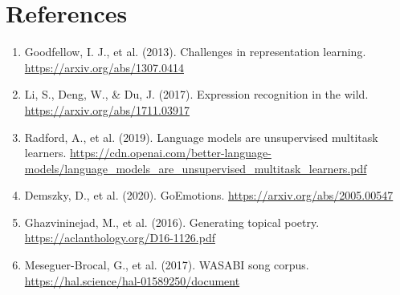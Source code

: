 \documentclass[11pt]{article}
\begin{document}
\section*{References}

\begin{enumerate}[leftmargin=*]
\item Goodfellow, I. J., et al. (2013). Challenges in representation learning. \url{https://arxiv.org/abs/1307.0414}
\item Li, S., Deng, W., \& Du, J. (2017). Expression recognition in the wild. \url{https://arxiv.org/abs/1711.03917}
\item Radford, A., et al. (2019). Language models are unsupervised multitask learners. \url{https://cdn.openai.com/better-language-models/language_models_are_unsupervised_multitask_learners.pdf}
\item Demszky, D., et al. (2020). GoEmotions. \url{https://arxiv.org/abs/2005.00547}
\item Ghazvininejad, M., et al. (2016). Generating topical poetry. \url{https://aclanthology.org/D16-1126.pdf}
\item Meseguer-Brocal, G., et al. (2017). WASABI song corpus. \url{https://hal.science/hal-01589250/document}
\end{enumerate}
\end{document}
